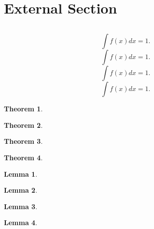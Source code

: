 \documentclass{article}
\newtheorem{theorem}{Theorem}
\newtheorem{lemma}{Lemma}
\begin{document}
  
  
  \section{External Section}
  \label{sec:External Section}
  \[
    
  \]
  
  \begin{equation}
    \label{eq:external equation 1}
    \int f(x) dx = 1.
  \end{equation}
  \begin{equation}
    \label{eq:external equation 2}
    \int f(x) dx = 1.
  \end{equation}
  \begin{equation}
    \label{eq:external equation 3}
    \int f(x) dx = 1.
  \end{equation}
  \begin{equation}
    \label{eq:external equation 4}
    \int f(x) dx = 1.
  \end{equation}

  \begin{theorem}
    \label{result:external theorem 1}
    
  \end{theorem}
  \begin{theorem}
    \label{result:external theorem 2}
    
  \end{theorem}
  \begin{theorem}
    \label{result:external theorem 3}
    
  \end{theorem}
  \begin{theorem}
    \label{result:external theorem 4}
    
  \end{theorem}

  \begin{lemma}
    \label{result:external lemma 1}
    
  \end{lemma}
  \begin{lemma}
    \label{result:external lemma 2}
    
  \end{lemma}
  \begin{lemma}
    \label{result:external lemma 3}
    
  \end{lemma}
  \begin{lemma}
    \label{result:external lemma 4}
    
  \end{lemma}
  
  
\end{document}
